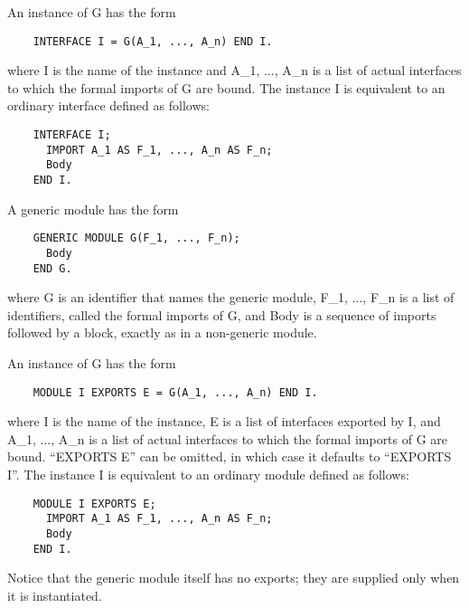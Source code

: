 \documentclass[10pt]{article}
\begin{document}
  An instance of G has the form 
\begin{verbatim}
    INTERFACE I = G(A_1, ..., A_n) END I.
\end{verbatim}
 where I is the name of the instance and A\_1, ..., A\_n is a list of actual interfaces to which the formal imports of G are bound. The instance I is equivalent to an ordinary interface defined as follows: 
\begin{verbatim}
    INTERFACE I;
      IMPORT A_1 AS F_1, ..., A_n AS F_n;
      Body
    END I.
\end{verbatim}



 A generic module has the form 
\begin{verbatim}
    GENERIC MODULE G(F_1, ..., F_n);
      Body
    END G.
\end{verbatim}
 where G is an identifier that names the generic module, F\_1, ..., F\_n is a list of identifiers, called the formal imports of G, and Body is a sequence of imports followed by a block, exactly as in a non-generic module. 


  An instance of G has the form 
\begin{verbatim}
    MODULE I EXPORTS E = G(A_1, ..., A_n) END I.
\end{verbatim}
 where I is the name of the instance, E is a list of interfaces exported by I, and A\_1, ..., A\_n is a list of actual interfaces to which the formal imports of G are bound. ``EXPORTS E'' can be omitted, in which case it defaults to ``EXPORTS I''. The instance I is equivalent to an ordinary module defined as follows: 
\begin{verbatim}
    MODULE I EXPORTS E;
      IMPORT A_1 AS F_1, ..., A_n AS F_n;
      Body
    END I.
\end{verbatim}
 Notice that the generic module itself has no exports; they are supplied only when it is instantiated. 
\end{document}
